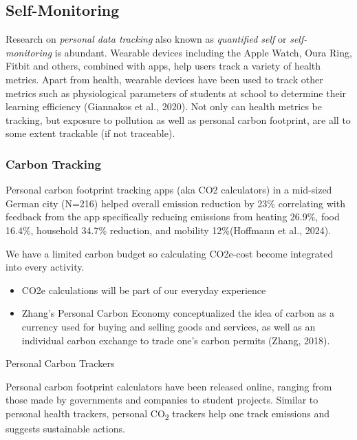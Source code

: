 \documentclass[
  letterpaper,
  DIV=11,
  numbers=noendperiod]{scrartcl}
\begin{document}
\subsection{Self-Monitoring}\label{self-monitoring}

Research on \emph{personal data tracking} also known as \emph{quantified
self} or \emph{self-monitoring} is abundant. Wearable devices including
the Apple Watch, Oura Ring, Fitbit and others, combined with apps, help
users track a variety of health metrics. Apart from health, wearable
devices have been used to track other metrics such as physiological
parameters of students at school to determine their learning efficiency
(Giannakos et al., 2020). Not only can health metrics be tracking, but
exposure to pollution as well as personal carbon footprint, are all to
some extent trackable (if not traceable).

\subsubsection{Carbon Tracking}\label{carbon-tracking}

Personal carbon footprint tracking apps (aka CO2 calculators) in a
mid-sized German city (N=216) helped overall emission reduction by 23\%
correlating with feedback from the app specifically reducing emissions
from heating 26.9\%, food 16.4\%, household 34.7\% reduction, and
mobility 12\%(Hoffmann et al., 2024).

We have a limited carbon budget so calculating CO2e-cost become
integrated into every activity.

\begin{itemize}
\item
  CO2e calculations will be part of our everyday experience
\item
  Zhang's Personal Carbon Economy conceptualized the idea of carbon as a
  currency used for buying and selling goods and services, as well as an
  individual carbon exchange to trade one's carbon permits (Zhang,
  2018).
\end{itemize}

Personal Carbon Trackers

Personal carbon footprint calculators have been released online, ranging
from those made by governments and companies to student projects.
Similar to personal health trackers, personal CO\textsubscript{2}
trackers help one track emissions and suggests sustainable actions.
\end{document}
